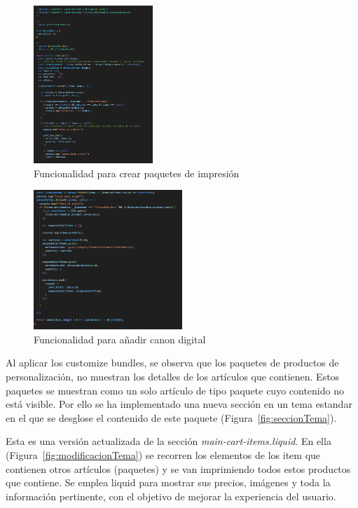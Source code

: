 \documentclass[12pt]{article}
\begin{document}
\begin{figure}[ht]
    \centering
    \includegraphics[width=0.4\textwidth]{imagenes-tema/primeraParteFunction.png}
    \caption{\label{fig:runpart1} Funcionalidad para crear paquetes de impresión} 
    \vspace{\fill}
\end{figure}

\begin{figure}[ht]
    \centering
    \includegraphics[width=0.5\textwidth]{imagenes-tema/segundaParteFunction.png}
    \caption{\label{fig:runpart2} Funcionalidad para añadir canon digital} 
    \vspace{\fill}
\end{figure}

Al aplicar los customize bundles, se observa que los paquetes de productos de personalización, no muestran los detalles de los artículos que contienen. Estos 
paquetes se muestran como un solo artículo de tipo paquete cuyo contenido no está visible. Por ello se ha implementado una nueva sección en un tema estandar en el que 
se desglose el contenido de este paquete (Figura~\ref{fig:seccionTema}).

Esta es una versión actualizada de la sección \textit{main-cart-items.liquid}. En ella (Figura~\ref{fig:modificacionTema}) se recorren los 
elementos de los item que contienen otros artículos (paquetes) y se van imprimiendo todos estos productos que contiene. Se emplea liquid para mostrar sus precios, imágenes y toda la información pertinente,
con el objetivo de mejorar la experiencia del usuario.
\end{document}
